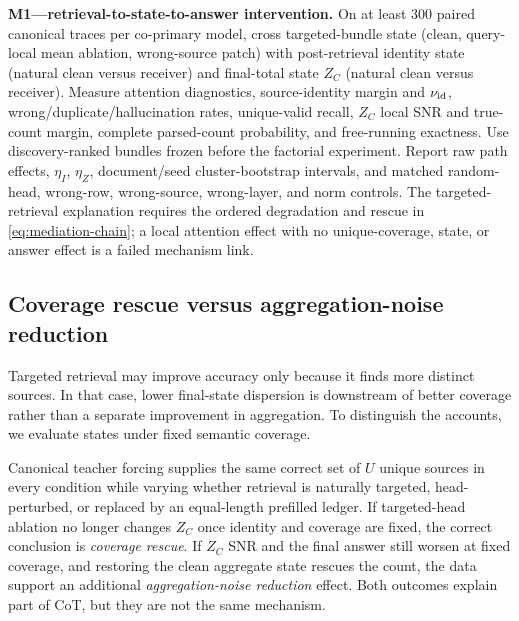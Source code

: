 \begin{todobox}
\textbf{M1---retrieval-to-state-to-answer intervention.}
On at least 300 paired canonical traces per co-primary model, cross targeted-bundle state (clean, query-local mean ablation, wrong-source patch) with post-retrieval identity state (natural clean versus receiver) and final-total state \(Z_C\) (natural clean versus receiver). Measure attention diagnostics, source-identity margin and \(\nu_{\rm id}\), wrong/duplicate/hallucination rates, unique-valid recall, \(Z_C\) local SNR and true-count margin, complete parsed-count probability, and free-running exactness. Use discovery-ranked bundles frozen before the factorial experiment. Report raw path effects, \(\eta_I\), \(\eta_Z\), document/seed cluster-bootstrap intervals, and matched random-head, wrong-row, wrong-source, wrong-layer, and norm controls. The targeted-retrieval explanation requires the ordered degradation and rescue in \cref{eq:mediation-chain}; a local attention effect with no unique-coverage, state, or answer effect is a failed mechanism link.
\end{todobox}

\subsection{Coverage rescue versus aggregation-noise reduction}

Targeted retrieval may improve accuracy only because it finds more distinct sources. In that case, lower final-state dispersion is downstream of better coverage rather than a separate improvement in aggregation. To distinguish the accounts, we evaluate states under fixed semantic coverage.

Canonical teacher forcing supplies the same correct set of \(U\) unique sources in every condition while varying whether retrieval is naturally targeted, head-perturbed, or replaced by an equal-length prefilled ledger. If targeted-head ablation no longer changes \(Z_C\) once identity and coverage are fixed, the correct conclusion is \emph{coverage rescue}. If \(Z_C\) SNR and the final answer still worsen at fixed coverage, and restoring the clean aggregate state rescues the count, the data support an additional \emph{aggregation-noise reduction} effect. Both outcomes explain part of CoT, but they are not the same mechanism.

